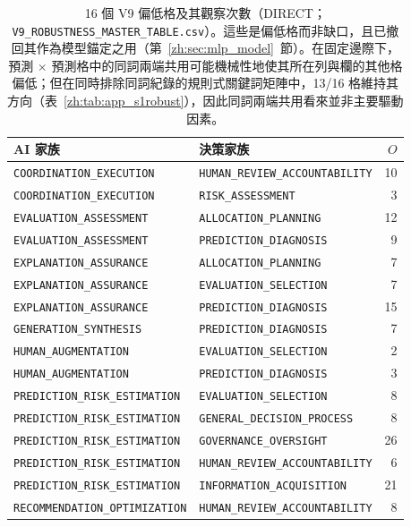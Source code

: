 \begin{table}[tbp]
\centering
\caption{16 個 V9 偏低格及其觀察次數（DIRECT；\texttt{V9\_ROBUSTNESS\_MASTER\_TABLE.csv}）。這些是偏低格而非缺口，且已撤回其作為模型錨定之用（第~\ref{zh:sec:mlp_model}~節）。在固定邊際下，預測 $\times$ 預測格中的同詞兩端共用可能機械性地使其所在列與欄的其他格偏低；但在同時排除同詞紀錄的規則式關鍵詞矩陣中，13/16 格維持其方向（表~\ref{zh:tab:app_s1robust}），因此同詞兩端共用看來並非主要驅動因素。}
\label{zh:tab:app_v9cells}
\footnotesize
\begin{tabular}{llr}
\toprule
AI 家族 & 決策家族 & $O$ \\
\midrule
\texttt{COORDINATION\_EXECUTION} & \texttt{HUMAN\_REVIEW\_ACCOUNTABILITY} & 10 \\
\texttt{COORDINATION\_EXECUTION} & \texttt{RISK\_ASSESSMENT} & 3 \\
\texttt{EVALUATION\_ASSESSMENT} & \texttt{ALLOCATION\_PLANNING} & 12 \\
\texttt{EVALUATION\_ASSESSMENT} & \texttt{PREDICTION\_DIAGNOSIS} & 9 \\
\texttt{EXPLANATION\_ASSURANCE} & \texttt{ALLOCATION\_PLANNING} & 7 \\
\texttt{EXPLANATION\_ASSURANCE} & \texttt{EVALUATION\_SELECTION} & 7 \\
\texttt{EXPLANATION\_ASSURANCE} & \texttt{PREDICTION\_DIAGNOSIS} & 15 \\
\texttt{GENERATION\_SYNTHESIS} & \texttt{PREDICTION\_DIAGNOSIS} & 7 \\
\texttt{HUMAN\_AUGMENTATION} & \texttt{EVALUATION\_SELECTION} & 2 \\
\texttt{HUMAN\_AUGMENTATION} & \texttt{PREDICTION\_DIAGNOSIS} & 3 \\
\texttt{PREDICTION\_RISK\_ESTIMATION} & \texttt{EVALUATION\_SELECTION} & 8 \\
\texttt{PREDICTION\_RISK\_ESTIMATION} & \texttt{GENERAL\_DECISION\_PROCESS} & 8 \\
\texttt{PREDICTION\_RISK\_ESTIMATION} & \texttt{GOVERNANCE\_OVERSIGHT} & 26 \\
\texttt{PREDICTION\_RISK\_ESTIMATION} & \texttt{HUMAN\_REVIEW\_ACCOUNTABILITY} & 6 \\
\texttt{PREDICTION\_RISK\_ESTIMATION} & \texttt{INFORMATION\_ACQUISITION} & 21 \\
\texttt{RECOMMENDATION\_OPTIMIZATION} & \texttt{HUMAN\_REVIEW\_ACCOUNTABILITY} & 8 \\
\bottomrule
\end{tabular}
\end{table}

